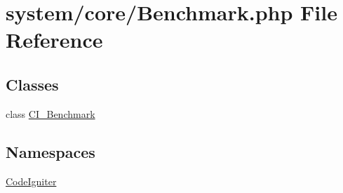 \hypertarget{_benchmark_8php}{}\section{system/core/\+Benchmark.php File Reference}
\label{_benchmark_8php}
\subsection*{Classes}
\begin{DoxyCompactItemize}
\item 
class \mbox{\hyperlink{class_c_i___benchmark}{C\+I\+\_\+\+Benchmark}}
\end{DoxyCompactItemize}
\subsection*{Namespaces}
\begin{DoxyCompactItemize}
\item 
 \mbox{\hyperlink{namespace_code_igniter}{Code\+Igniter}}
\end{DoxyCompactItemize}
